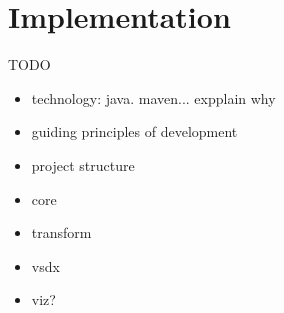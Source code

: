 \chapter{Implementation}
\label{chap:impl}

TODO

\begin{itemize}
\item technology: java. maven... expplain why
\item guiding principles of development
\item project structure
\item core
\item transform
\item vsdx
\item viz?
\end{itemize}